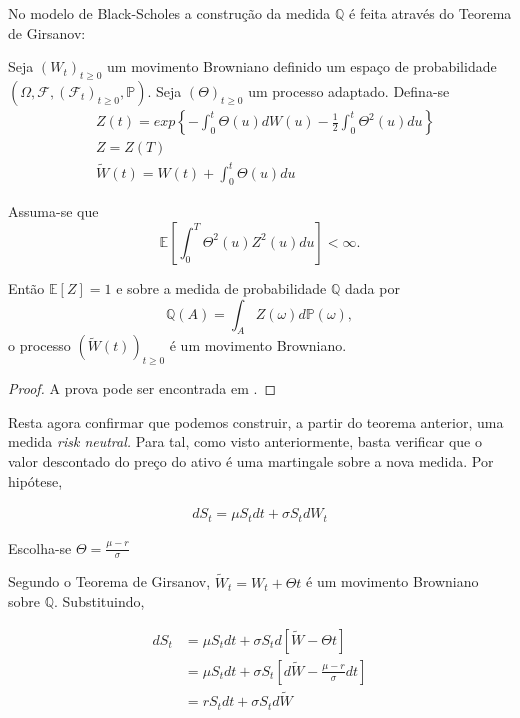 \documentclass{article}
\begin{document}
\vspace{0.5cm}

No modelo de Black-Scholes a construção da medida $\mathbb{Q}$ é feita através do Teorema de Girsanov:

\begin{thm}[Girsanov]
    Seja $(W_t)_{t \geq 0} $ um movimento Browniano definido um espaço de probabilidade $(\Omega, \mathcal{F},(\mathcal{F}_t)_{t \geq0}, \mathbb{P})$. Seja $(\Theta)_{t \geq 0}$ um processo adaptado. Defina-se
    \begin{align*}
        &Z(t)=exp \left\{-\int_0^t\Theta(u)dW(u)-\frac{1}{2}\int_0^t\Theta^2(u)du\right\}\\
        &Z=Z(T)\\
        &\tilde{W}(t)=W(t)+\int_0^t\Theta(u)du
    \end{align*}

    Assuma-se que $$\mathbb{E}\left[ \int_0^T \Theta^2(u)Z^2(u)du \right] < \infty.$$ 
    
    Então $\mathbb{E}[Z]=1$ e sobre a medida de probabilidade $\mathbb{Q}$ dada por $$\mathbb{Q}(A)=\int_AZ(\omega)d\mathbb{P}(\omega),$$
    o processo $(\tilde{W}(t))_{t\geq 0}$ é um movimento Browniano. 
\end{thm}
\begin{proof}
    A prova pode ser encontrada em \cite{Shreve2004}.
\end{proof}


\vspace{0.5cm}

Resta agora confirmar que podemos construir, a partir do teorema anterior, uma medida \textit{risk neutral.} Para tal, como visto anteriormente, basta verificar que o valor descontado do preço do ativo é uma martingale sobre a nova medida. Por hipótese,

\begin{align*}
    dS_t=\mu S_tdt+\sigma S_tdW_t
\end{align*}

Escolha-se $\Theta=\frac{\mu-r}{\sigma}$

Segundo o Teorema de Girsanov, $\tilde{W}_t=W_t+\Theta t$ é um movimento Browniano sobre $\mathbb{Q}$. Substituindo,

\begin{align*}
    dS_t&= \mu S_t dt +\sigma S_t d[\tilde{W}-\Theta t]\\
        &= \mu S_tdt+ \sigma S_t [d\tilde{W}-\frac{\mu-r}{\sigma}dt]\\
        &= r S_tdt+ \sigma S_t d\tilde{W}
\end{align*}
\end{document}
